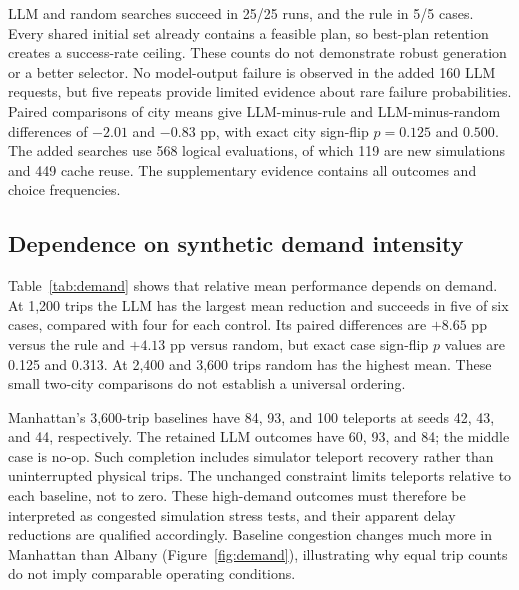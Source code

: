 \documentclass[11pt]{article}
\begin{document}
\begin{table}[htbp]\centering\small
\caption{Fixed-demand stability. All improvements are percentages; LLM and random have five repeats per city, the rule one evaluation. SD is within-city sampling dispersion.}\label{tab:stability}

\end{table}

LLM and random searches succeed in 25/25 runs, and the rule in 5/5 cases. Every shared initial set already contains a feasible plan, so best-plan retention creates a success-rate ceiling. These counts do not demonstrate robust generation or a better selector. No model-output failure is observed in the added 160 LLM requests, but five repeats provide limited evidence about rare failure probabilities. Paired comparisons of city means give LLM-minus-rule and LLM-minus-random differences of $-2.01$ and $-0.83$ pp, with exact city sign-flip $p=0.125$ and $0.500$. The added searches use 568 logical evaluations, of which 119 are new simulations and 449 cache reuse. The supplementary evidence contains all outcomes and choice frequencies.

\subsection{Dependence on synthetic demand intensity}\label{sec:demand-results}
Table~\ref{tab:demand} shows that relative mean performance depends on demand. At 1,200 trips the LLM has the largest mean reduction and succeeds in five of six cases, compared with four for each control. Its paired differences are $+8.65$ pp versus the rule and $+4.13$ pp versus random, but exact case sign-flip $p$ values are 0.125 and 0.313. At 2,400 and 3,600 trips random has the highest mean. These small two-city comparisons do not establish a universal ordering.

\begin{table}[htbp]\centering\small
\caption{Synthetic intensity sensitivity: six city--seed cases per level, one search per method/scenario. SD is across cases; 2,400-trip rows reuse the corresponding primary cases.}\label{tab:demand}

\end{table}

Manhattan's 3,600-trip baselines have 84, 93, and 100 teleports at seeds 42, 43, and 44, respectively. The retained LLM outcomes have 60, 93, and 84; the middle case is no-op. Such completion includes simulator teleport recovery rather than uninterrupted physical trips. The unchanged constraint limits teleports relative to each baseline, not to zero. These high-demand outcomes must therefore be interpreted as congested simulation stress tests, and their apparent delay reductions are qualified accordingly. Baseline congestion changes much more in Manhattan than Albany (Figure~\ref{fig:demand}), illustrating why equal trip counts do not imply comparable operating conditions.
\end{document}
